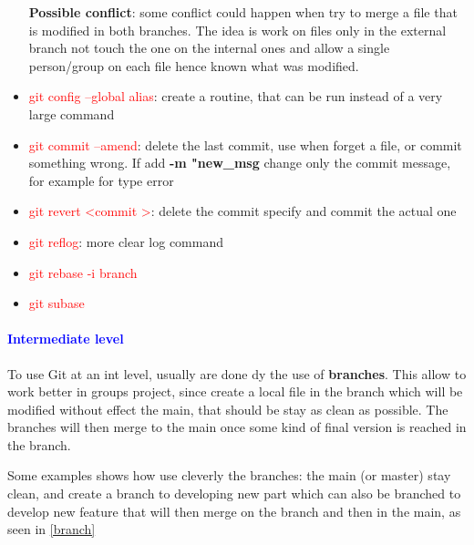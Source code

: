 \documentclass{report}
\begin{document}
\begin{itemize}
     \textbf{Possible conflict}: some conflict could happen when try to merge a file that is modified in both branches. The idea is work on files only in the external branch not touch the one on the internal ones and allow a single person/group on each file hence known what was modified.
     \item \textcolor{red}{git config --global alias}: create a routine, that can be run instead of a very large command
    \item \textcolor{red}{git commit --amend}: delete the last commit, use when forget a file, or commit something wrong. If add \textbf{-m "new\_msg} change only the commit message, for example for type error
    \item \textcolor{red}{git revert \textless commit \textgreater}: delete the commit specify and commit the actual one 
    \item \textcolor{red}{git reflog}: more clear log command 
    \item \textcolor{red}{git rebase -i branch}
    \item \textcolor{red}{git subase}
\end{itemize}

\paragraph*{\textcolor{blue}{Intermediate level}}
To use Git at an int level, usually are done dy the use of \textbf{branches}. This allow to work better in groups project, since create a local file in the branch which will be modified without effect the main, that should be stay as clean as possible. The branches will then merge to the main once some kind of final version is reached in the branch. 

Some examples shows how use cleverly the branches: the main (or master) stay clean, and create a branch to developing new part which can also be branched 
to develop new feature that will then merge on the branch and then in the main, as seen in \autoref{branch} 
\end{document}
